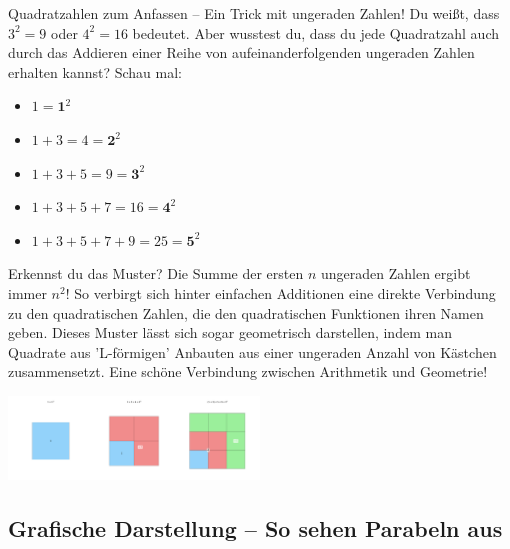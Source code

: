 \begin{funfactbox}{Quadratzahlen zum Anfassen – Ein Trick mit ungeraden Zahlen!}
Du weißt, dass $3^2 = 9$ oder $4^2 = 16$ bedeutet. Aber wusstest du, dass du jede Quadratzahl auch durch das Addieren einer Reihe von aufeinanderfolgenden ungeraden Zahlen erhalten kannst? Schau mal:
\begin{itemize}
    \item $1 = \mathbf{1}^2$
    \item $1 + 3 = 4 = \mathbf{2}^2$
    \item $1 + 3 + 5 = 9 = \mathbf{3}^2$
    \item $1 + 3 + 5 + 7 = 16 = \mathbf{4}^2$
    \item $1 + 3 + 5 + 7 + 9 = 25 = \mathbf{5}^2$
\end{itemize}
Erkennst du das Muster? Die Summe der ersten $n$ ungeraden Zahlen ergibt immer $n^2$!
So verbirgt sich hinter einfachen Additionen eine direkte Verbindung zu den quadratischen Zahlen, die den quadratischen Funktionen ihren Namen geben. Dieses Muster lässt sich sogar geometrisch darstellen, indem man Quadrate aus 'L-förmigen' Anbauten aus einer ungeraden Anzahl von Kästchen zusammensetzt. Eine schöne Verbindung zwischen Arithmetik und Geometrie!

\begin{center}
    \includegraphics[width=0.5\textwidth]{grafiken/Summe_Ungerade_Zahlen_Quadrate.png}
    \label{fig:summe_ungerade_quadrate}
\end{center}
\end{funfactbox}
\subsection{Grafische Darstellung – So sehen Parabeln aus}

